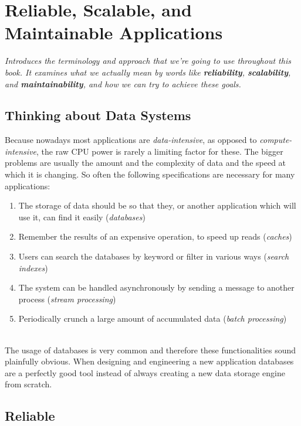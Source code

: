 \documentclass{article}
\begin{document}
	\pagestyle{fancy}
	\section{Reliable, Scalable, and Maintainable Applications}
	\begin{adjustwidth}{2em}{2em}
		\textit{Introduces the terminology and approach that we're going to use throughout this book. It examines what we actually mean by words like \textbf{reliability}, \textbf{scalability}, and \textbf{maintainability}, and how we can try to achieve these goals.}
		\subsection{Thinking about Data Systems}
		\begin{adjustwidth}{2em}{2em}
			Because nowadays most applications are \textit{data-intensive}, as opposed to \textit{compute-intensive}, the raw CPU power is rarely a limiting factor for these. The bigger problems are usually the amount and the complexity of data and the speed at which it is changing. So often the following specifications are necessary for many applications: \\
			\begin{adjustwidth}{1em}{1em}
				\begin{enumerate}[\footnotesize{\textbullet}]
					\item The storage of data should be so that they, or another application which will use it, can find it easily (\textit{databases})
					\item Remember the results of an expensive operation, to speed up reads (\textit{caches})
					\item Users can search the databases by keyword or filter in various ways (\textit{search indexes})
					\item The system can be handled asynchronously by sending a message to another process (\textit{stream processing})
					\item Periodically crunch a large amount of accumulated data (\textit{batch processing})
				\end{enumerate}
			\end{adjustwidth}
			\hfill \\
			The usage of databases is very common and therefore these functionalities sound plainfully obvious. When designing and engineering a new application databases are a perfectly good tool instead of always creating a new data storage engine from scratch.
		\end{adjustwidth}
		\subsection{Reliable}
		\begin{adjustwidth}{2em}{2em}
		\end{adjustwidth}
	\end{adjustwidth}
	
\end{document}
